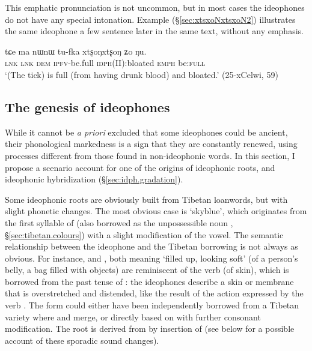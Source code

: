 This emphatic pronunciation is not uncommon, but in most cases the ideophones do not have any special intonation. Example (§\ref{sec:xtsxoNxtsxoN2}) illustrates the same ideophone  a few sentence later in the same text, without any emphasis.

\begin{exe}
\ex \label{sec:xtsxoNxtsxoN2}
\gll tɕe ma nɯnɯ tu-fka xtʂoŋxtʂoŋ ʑo ŋu. \\
\textsc{lnk} \textsc{lnk} \textsc{dem} \textsc{ipfv}-be.full \textsc{idph}(II):bloated \textsc{emph} be:\textsc{full} \\
\glt `(The tick) is full (from having drunk blood) and bloated.' (25-xCelwi, 59)
\end{exe}

\subsection{The genesis of ideophones} \label{sec:genesis.idph}
While it cannot be \textit{a priori} excluded that some ideophones could be ancient, their phonological markedness is a sign that they are constantly renewed, using processes different from those found in non-ideophonic words. In this section, I propose a scenario account for one of the origins of ideophonic roots, and  ideophonic hybridization (§\ref{sec:idph.gradation}).

Some ideophonic roots are obviously built from Tibetan loanwords, but with slight phonetic changes. The most obvious case is  `skyblue', which originates from the first syllable of  (also borrowed as the unpossessible noun , §\ref{sec:tibetan.colours}) with a slight modification of the vowel. The semantic relationship between the ideophone and the Tibetan borrowing is not always as obvious. For instance,  and , both meaning `filled up, looking soft' (of a person's belly, a bag filled with objects) are reminiscent of the verb  (of skin), which is borrowed from the past tense of : the ideophones describe a skin or membrane that is overstretched and distended, like the result of the action expressed by the verb . The form  could either have been independently borrowed from a Tibetan variety where  and  merge, or directly based on  with further consonant modification. The root  is derived from  by insertion of  (see below for a possible account of these sporadic sound changes).
 
